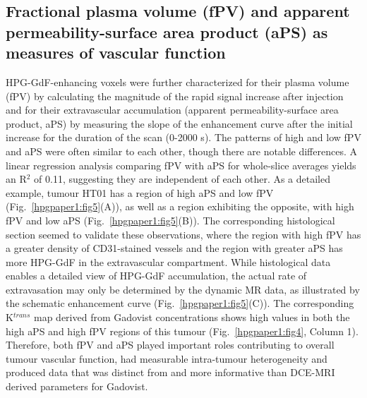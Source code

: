 \subsection{Fractional plasma volume (\acs{fPV}) and apparent permeability-surface area product (\acs{aPS}) as measures of vascular function}

\acs{HPG-GdF}-enhancing voxels were further characterized for their plasma volume (\acs{fPV}) by calculating the magnitude of the rapid signal increase after injection and for their extravascular accumulation (apparent permeability-surface area product, \acs{aPS}) by measuring the slope of the enhancement curve after the initial increase for the duration of the scan (0-2000 s).
The patterns of high and low \acs{fPV} and \acs{aPS} were often similar to each other, though there are notable differences.
A linear regression analysis comparing \acs{fPV} with \acs{aPS} for whole-slice averages yields an R$^2$ of 0.11, suggesting they are independent of each other.
As a detailed example, tumour HT01 has a region of high \acs{aPS} and low \acs{fPV} (Fig.~\ref{hpgpaper1:fig5}(A)), as well as a region exhibiting the opposite, with high \acs{fPV} and low \acs{aPS} (Fig.~\ref{hpgpaper1:fig5}(B)).
The corresponding histological section seemed to validate these observations, where the region with high \acs{fPV} has a greater density of \acs{CD31}-stained vessels and the region with greater \acs{aPS} has more \acs{HPG-GdF} in the extravascular compartment.
While histological data enables a detailed view of \acs{HPG-GdF} accumulation, the actual rate of extravasation may only be determined by the dynamic MR data, as illustrated by the schematic enhancement curve (Fig.~\ref{hpgpaper1:fig5}(C)).
The corresponding K$^{trans}$ map derived from Gadovist concentrations shows high values in both the high \acs{aPS} and high \acs{fPV} regions of this tumour (Fig.~\ref{hpgpaper1:fig4}, Column 1).
Therefore, both \acs{fPV} and \acs{aPS} played important roles contributing to overall tumour vascular function, had measurable intra-tumour heterogeneity and produced data that was distinct from and more informative than \acs{DCE-MRI} derived parameters for Gadovist.

